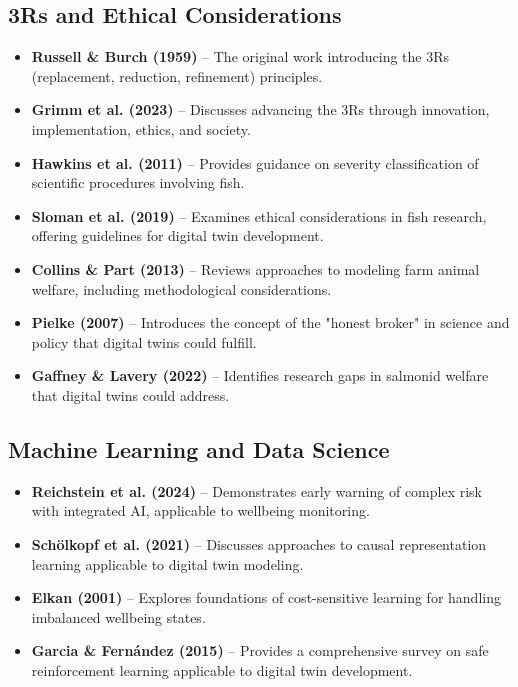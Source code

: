 \documentclass[11pt,a4paper]{article}
\begin{document}
\subsection*{3Rs and Ethical Considerations}
\begin{itemize}
    \item \textbf{Russell \& Burch (1959)} \cite{russell1959principles} -- The original work introducing the 3Rs (replacement, reduction, refinement) principles.
    
    \item \textbf{Grimm et al. (2023)} \cite{grimm2023advancing} -- Discusses advancing the 3Rs through innovation, implementation, ethics, and society.
    
    \item \textbf{Hawkins et al. (2011)} \cite{hawkins2011guidance} -- Provides guidance on severity classification of scientific procedures involving fish.
    
    \item \textbf{Sloman et al. (2019)} \cite{sloman2019ethical} -- Examines ethical considerations in fish research, offering guidelines for digital twin development.
    
    \item \textbf{Collins \& Part (2013)} \cite{collins2013modelling} -- Reviews approaches to modeling farm animal welfare, including methodological considerations.
    
    \item \textbf{Pielke (2007)} \cite{pielke2007honest} -- Introduces the concept of the "honest broker" in science and policy that digital twins could fulfill.
    
    \item \textbf{Gaffney \& Lavery (2022)} \cite{gaffney2022research} -- Identifies research gaps in salmonid welfare that digital twins could address.
\end{itemize}

\subsection*{Machine Learning and Data Science}
\begin{itemize}
    \item \textbf{Reichstein et al. (2024)} \cite{reichstein2024early} -- Demonstrates early warning of complex risk with integrated AI, applicable to wellbeing monitoring.
    
    \item \textbf{Schölkopf et al. (2021)} \cite{scholkopf2021toward} -- Discusses approaches to causal representation learning applicable to digital twin modeling.
    
    \item \textbf{Elkan (2001)} \cite{elkan2001foundations} -- Explores foundations of cost-sensitive learning for handling imbalanced wellbeing states.
    
    \item \textbf{Garcia \& Fernández (2015)} \cite{garcia2015comprehensive} -- Provides a comprehensive survey on safe reinforcement learning applicable to digital twin development.
\end{itemize}
\end{document}
